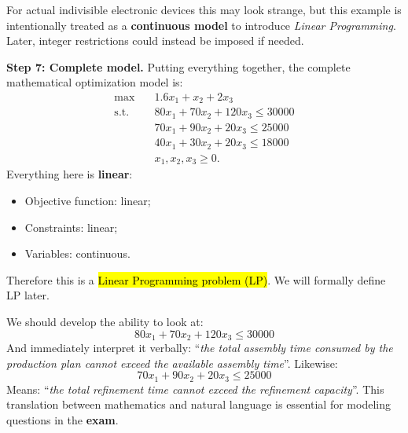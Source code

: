 \begin{examplebox}
    \textcolor{Red2}{} For actual indivisible electronic devices this may look strange, but this example is intentionally treated as a \textbf{continuous model} to introduce \emph{Linear Programming}. Later, integer restrictions could instead be imposed if needed.

    \highspace
    \textcolor{Green3}{ \textbf{Step 7: Complete model.}} Putting everything together, the complete mathematical optimization model is:
    \begin{equation*}
        \boxed{
            \begin{aligned}
                \max\quad
                &1.6x_1+x_2+2x_3\\[1mm]
                \text{s.t.}\quad
                &80x_1+70x_2+120x_3\leq30000\\
                &70x_1+90x_2+20x_3\leq25000\\
                &40x_1+30x_2+20x_3\leq18000\\
                &x_1,x_2,x_3\geq0.
            \end{aligned}
        }
    \end{equation*}
    Everything here is \textbf{linear}:
    \begin{itemize}
        \item Objective function: linear;
        \item Constraints: linear;
        \item Variables: continuous.
    \end{itemize}
    Therefore this is a \hl{Linear Programming problem (LP)}. We will formally define LP later.

    \highspace
    \begin{deepeningbox}
        We should develop the ability to look at:
        \begin{equation*}
            80x_1+70x_2+120x_3\leq30000
        \end{equation*}
        And immediately interpret it verbally: ``\emph{the total assembly time consumed by the production plan cannot exceed the available assembly time}''. Likewise:
        \begin{equation*}
            70x_1+90x_2+20x_3\leq25000
        \end{equation*}
        Means: ``\emph{the total refinement time cannot exceed the refinement capacity}''. This translation between mathematics and natural language is essential for modeling questions in the \textbf{exam}.
    \end{deepeningbox}
\end{examplebox}

